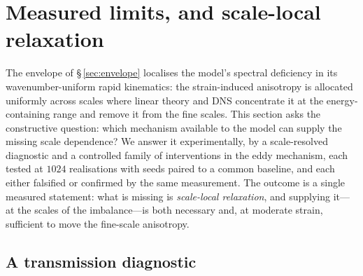 \documentclass[lineno]{JFM-FLM_Au}
\begin{document}
\section{Measured limits, and scale-local relaxation}\label{sec:limits}

The envelope of \S\,\ref{sec:envelope} localises the model's spectral
deficiency in its wavenumber-uniform rapid kinematics: the strain-induced
anisotropy is allocated uniformly across scales where linear theory and
DNS concentrate it at the energy-containing range and remove it from the
fine scales. This section asks the constructive question: which mechanism
available to the model can supply the missing scale dependence? We answer
it experimentally, by a scale-resolved diagnostic and a controlled family
of interventions in the eddy mechanism, each tested at $1024$
realisations with seeds paired to a common baseline, and each either
falsified or confirmed by the same measurement. The outcome is a single
measured statement: what is missing is \emph{scale-local relaxation}, and
supplying it---at the scales of the imbalance---is both necessary and, at
moderate strain, sufficient to move the fine-scale anisotropy.

\subsection{A transmission diagnostic}\label{sec:transmission}
\end{document}
